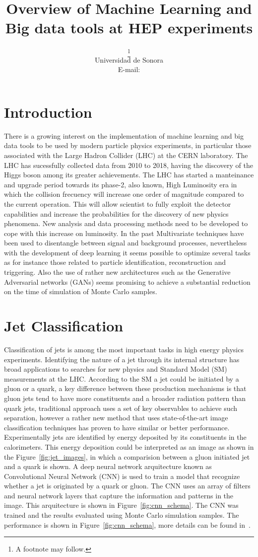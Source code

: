 \documentclass{PoS}
\title{Overview of Machine Learning and Big data tools at HEP experiments}
\author{\speaker{A. Castaneda}\thanks{A footnote may follow.}\\
        Universidad de Sonora\\
        E-mail: \email{castaned@cern.ch}}
\begin{document}
\section{Introduction}

There is a growing interest on the implementation of machine learning and big data tools to be used by modern particle physics
experiments, in particular those associated with the Large Hadron Collider (LHC) at the CERN laboratory. The LHC has sucessfully
collected data from 2010 to 2018, having the discovery of the Higgs boson among its greater achievements. The LHC has started
a manteinance and upgrade period towards its phase-2, also known, High Luminosity era in which the collision frecuency will increase one
order of magnitude compared to the current operation. This will allow scientist to fully exploit the detector capabilities and increase
the probabilities for the discovery of new physics phenomena.  New analysis and data processing methods need to be developed to cope with
this increase on luminosity. In the past Multivariate techniques have been used to disentangle between signal and background processes,
nevertheless with the development of deep learning it seems possible to optimize several tasks as for instance those related to particle
identification, reconstruction and triggering. Also the use of rather new architectures such as the Generative Adversarial networks (GANs)
seems promising to achieve a substantial reduction on the time of simulation of Monte Carlo samples. 


\section{Jet Classification}

Classification of jets is among the most important tasks in high energy physics experiments. Identifying the nature of a jet through
its internal structure has broad applications to searches for new physics and Standard Model (SM) measurements at the LHC. According to the
SM a jet could be initiated by a gluon or a quark, a key difference between these production mechanisms is that gluon jets
tend to have more constituents and a broader radiation pattern than quark jets, traditional approach uses a set of key observables to
achieve such separation, however a rather new method that uses state-of-the-art image classification techniques has proven to have similar
or better performance. Experimentally jets are identified by energy deposited by its constituents in the calorimeters. This energy deposition
could be interpreted as an image as shown in the Figure~\ref{fig:jet_images}, in which a comparision between a gluon initiated jet and a quark
is shown. A deep neural network arquitecture known as Convolutional Neural Network (CNN) is used to train a model that recognize whether
a jet is originated by a quark or gluon.  The CNN uses an array of filters and neural network layers that capture the information and patterns
in the image. This arquitecture is shown in Figure~\ref{fig:cnn_schema}. The CNN was trained and the results evaluated using Monte Carlo simulation
samples. The performance is shown in Figure~\ref{fig:cnn_schema}, more details can be found in~\cite{cnn_jets}.
\end{document}
